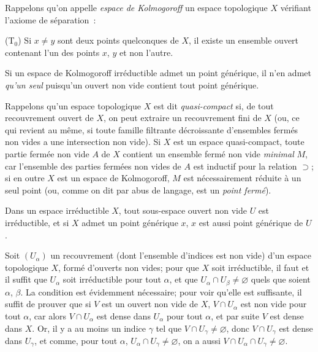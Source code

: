 \begin{env}[2.1.3]
\label{0.2.1.3-fr}
Rappelons qu'on appelle \emph{espace de Kolmogoroff} un espace topologique $X$
vérifiant l'axiome de séparation~:

\smallskip
\noindent
\textup{(T$_0$)} Si $x\neq y$ sont deux points quelconques de $X$, il existe
un ensemble ouvert contenant l'un des points $x$, $y$ et non l'autre.

Si un espace de Kolmogoroff irréductible admet un point générique, il n'en
admet \emph{qu'un seul} puisqu'un ouvert non vide contient tout point
générique.

Rappelons qu'un espace topologique $X$ est dit \emph{quasi-compact} si, de tout
recouvrement ouvert de $X$, on peut extraire un recouvrement fini de $X$ (ou,
ce qui revient au même, si toute famille filtrante décroissante d'ensembles
fermés non vides a une intersection non vide). Si $X$ est un espace
quasi-compact, toute partie fermée non vide $A$ de $X$ contient un ensemble
fermé non vide \emph{minimal} $M$, car l'ensemble des parties fermées non vides
de $A$ est inductif pour la relation $\supset$; si en outre $X$ est un espace
de Kolmogoroff, $M$ est nécessairement réduite à un seul point (ou, comme on
dit par abus de langage, est un \emph{point fermé}).
\end{env}

\begin{env}[2.1.4]
\label{0.2.1.4-fr}
Dans un espace irréductible $X$, tout sous-espace ouvert non vide $U$ est
irréductible, et si $X$ admet un point générique $x$, $x$ est aussi point
générique de $U$.

Soit $(U_\alpha)$ un recouvrement (dont l'ensemble d'indices est non vide) d'un
espace topologique $X$, formé d'ouverts non vides; pour que $X$ soit
irréductible, il faut et il suffit que $U_\alpha$ soit irréductible pour tout
$\alpha$, et que $U_\alpha\cap U_\beta\neq\varnothing$ quels que soient
$\alpha$, $\beta$. La condition est évidemment nécessaire; pour voir qu'elle
est suffisante, il suffit de prouver que si $V$ est un ouvert non vide de $X$,
$V\cap U_\alpha$ est non vide pour tout $\alpha$, car alors $V\cap U_\alpha$
est dense dans $U_\alpha$ pour tout $\alpha$, et par suite $V$ est dense dans
$X$. Or, il y a au moins un indice $\gamma$ tel que
$V\cap U_\gamma\neq\varnothing$, donc $V\cap U_\gamma$ est dense dans
$U_\gamma$, et comme, pour tout $\alpha$,
$U_\alpha\cap U_\gamma\neq\varnothing$, on a aussi
$V\cap U_\alpha\cap U_\gamma\neq\varnothing$.
\end{env}


